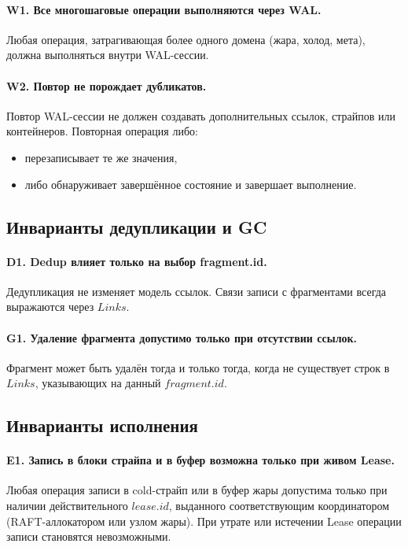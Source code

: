 \documentclass[a4paper,12pt]{article}
\begin{document}
    \paragraph{W1. Все многошаговые операции выполняются через WAL.}
    Любая операция, затрагивающая более одного домена
    (жара, холод, мета), должна выполняться внутри WAL-сессии.

    \paragraph{W2. Повтор не порождает дубликатов.}
    Повтор WAL-сессии не должен создавать дополнительных ссылок,
    страйпов или контейнеров. Повторная операция либо:
    \begin{itemize}
        \item перезаписывает те же значения,
        \item либо обнаруживает завершённое состояние и завершает выполнение.
    \end{itemize}

    \subsection{Инварианты дедупликации и GC}

    \paragraph{D1. Dedup влияет только на выбор fragment.id.}
    Дедупликация не изменяет модель ссылок. Связи записи с фрагментами
    всегда выражаются через $Links$.

    \paragraph{G1. Удаление фрагмента допустимо только при отсутствии ссылок.}
    Фрагмент может быть удалён тогда и только тогда, когда не существует
    строк в $Links$, указывающих на данный $fragment.id$.

    \subsection{Инварианты исполнения}

    \paragraph{E1. Запись в блоки страйпа и в буфер возможна только при живом Lease.}
    Любая операция записи в cold-страйп или в буфер жары допустима только при наличии действительного $lease.id$, выданного соответствующим
    координатором (RAFT-аллокатором или узлом жары). При утрате или истечении Lease операции записи становятся невозможными.
\end{document}
